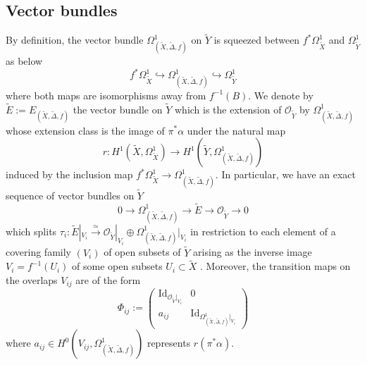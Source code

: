 \documentclass[12pt]{amsart}
\theoremstyle{definition}
\newcommand{\tX}{\widetilde{X}}
\newcommand{\tY}{\widetilde{Y}}
\newcommand{\tE}{\widetilde{E}}
\newcommand{\cO}{\mathcal{O}}
\numberwithin{equation}{section}
\newcommand{\tDe}{\widetilde \Delta}
\begin{document}
\subsection{Vector bundles}
By definition, the vector bundle $\Omega^1_{(\tX,\tDe, f)}$ on $\tY$ is squeezed between $f^*\Omega_{\tX}^1$ and  $\Omega_{\tY}^1$ as below
\begin{equation}
\label{sandwich}
 f^*\Omega_{\tX}^1 \hookrightarrow \Omega^1_{(\tX,\tDe, f)} \hookrightarrow \Omega_{\tY}^1
 \end{equation}
where both maps are isomorphisms away from $f^{-1}(B)$. We denote by $\tE:=E_{(\tX, \tDe, f)}$ the vector bundle on $\tY$ which is the extension of $\cO_{\tY}$ by $\Omega^1_{(\tX,\tDe, f)}$ whose extension class is the image of $\pi^*\alpha$ under the natural map 
\begin{equation}
\label{pullback}
r:H^1(\tX,\Omega_{\tX}^1)\to H^1(\tY, \Omega^1_{(\tX,\tDe, f)})
\end{equation} induced by the inclusion map $f^*\Omega_{\tX}^1 \to \Omega^1_{(\tX,\tDe, f)}$. In particular, we have an exact sequence of vector bundles on $\tY$
\[0\longrightarrow  \Omega^1_{(\tX,\tDe, f)} \longrightarrow \tE \longrightarrow \cO_{\tY} \longrightarrow 0\]
which splits $\tau_i:\tE|_{V_i}\overset{\simeq}{\longrightarrow} \cO_{\tY}|_{V_i} \oplus  \Omega^1_{(\tX,\tDe, f)}|_{V_i}$ in restriction to each element of a covering family $(V_i)$ of open subsets of $\tY$ arising as the inverse image $V_i=f^{-1}(U_i)$ of some open subsets $U_i\subset \tX$ . Moreover, the transition maps on the overlaps $V_{ij}$ are of the form
\begin{equation}
\label{transition}
\Phi_{ij}:=
\begin{pmatrix}
\mathrm{Id}_{\cO_{\tY}|_{V_i}} &0 \\
a_{ij}& \mathrm{Id}_{\Omega^1_{(\tX,\tDe, f)}|_{V_i}}
\end{pmatrix}
\end{equation}
where $a_{ij}\in H^0(V_{ij},\Omega^1_{(\tX,\tDe, f)})$ represents $r(\pi^*\alpha)$. 
\end{document}
